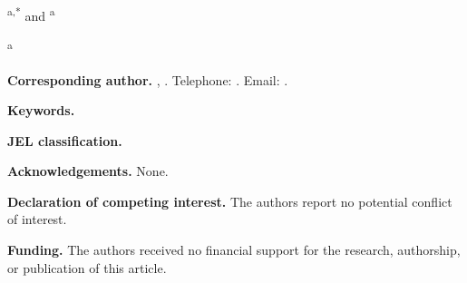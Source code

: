 \documentclass[11pt]{article}
\begin{document}
\begin{center}
  {\Large\bfseries \papertitle\par}
  \bigskip
  {\large \paperauthorone\textsuperscript{a,*} and
  \paperauthortwo\textsuperscript{a}\par}
  \medskip
  \textsuperscript{a}\paperaffiliations
\end{center}

\bigskip

\textbf{Corresponding author.}
\paperauthorone, \paperpostaladdress.
Telephone: \paperphone.
Email: \href{mailto:\paperemail}{\paperemail}.

\textbf{Keywords.} \paperkeywords

\textbf{JEL classification.} \paperjel

\textbf{Acknowledgements.} None.

\textbf{Declaration of competing interest.} The authors report no potential
conflict of interest.

\textbf{Funding.} The authors received no financial support for the research,
authorship, or publication of this article.
\end{document}
